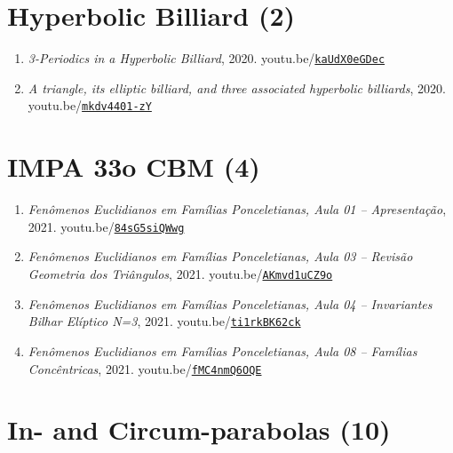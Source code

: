 \documentclass[12pt]{article}
\begin{document}
\section{Hyperbolic Billiard (2)}

\begin{enumerate}[resume]
\item \textit{3-Periodics in a Hyperbolic Billiard}, 2020. youtu.be/\href{https://youtu.be/kaUdX0eGDec}{\nolinkurl{kaUdX0eGDec}}
\item \textit{A triangle, its elliptic billiard, and three associated hyperbolic billiards}, 2020. youtu.be/\href{https://youtu.be/mkdv4401-zY}{\nolinkurl{mkdv4401-zY}}
\end{enumerate}

\section{IMPA 33o CBM (4)}

\begin{enumerate}[resume]
\item \textit{Fenômenos Euclidianos em Famílias Ponceletianas, Aula 01 -- Apresentação}, 2021. youtu.be/\href{https://youtu.be/84sG5siQWwg}{\nolinkurl{84sG5siQWwg}}
\item \textit{Fenômenos Euclidianos em Famílias Ponceletianas, Aula 03 -- Revisão Geometria dos Triângulos}, 2021. youtu.be/\href{https://youtu.be/AKmvd1uCZ9o}{\nolinkurl{AKmvd1uCZ9o}}
\item \textit{Fenômenos Euclidianos em Famílias Ponceletianas, Aula 04 -- Invariantes Bilhar Elíptico N=3}, 2021. youtu.be/\href{https://youtu.be/ti1rkBK62ck}{\nolinkurl{ti1rkBK62ck}}
\item \textit{Fenômenos Euclidianos em Famílias Ponceletianas, Aula 08 -- Famílias Concêntricas}, 2021. youtu.be/\href{https://youtu.be/fMC4nmQ6OQE}{\nolinkurl{fMC4nmQ6OQE}}
\end{enumerate}

\section{In- and Circum-parabolas (10)}
\end{document}
